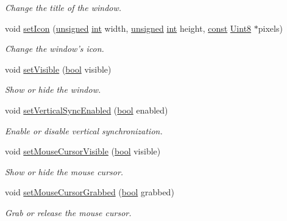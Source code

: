 \begin{DoxyCompactItemize}
\begin{DoxyCompactList}\small\item\em Change the title of the window. \end{DoxyCompactList}\item 
void \hyperlink{classsf_1_1_window_a63af61e026fba08e3153fd013620bcc0}{set\-Icon} (\hyperlink{curses_8priv_8h_aca40206900cfc164654362fa8d4ad1e6}{unsigned} \hyperlink{term__entry_8h_ad65b480f8c8270356b45a9890f6499ae}{int} width, \hyperlink{curses_8priv_8h_aca40206900cfc164654362fa8d4ad1e6}{unsigned} \hyperlink{term__entry_8h_ad65b480f8c8270356b45a9890f6499ae}{int} height, \hyperlink{term__entry_8h_a57bd63ce7f9a353488880e3de6692d5a}{const} \hyperlink{namespacesf_a4ef3d630785c4f296f9b4f274c33d78e}{Uint8} $\ast$pixels)
\begin{DoxyCompactList}\small\item\em Change the window's icon. \end{DoxyCompactList}\item 
void \hyperlink{classsf_1_1_window_a160f7f11a207603d7e99ce606e749703}{set\-Visible} (\hyperlink{term__entry_8h_a002004ba5d663f149f6c38064926abac}{bool} visible)
\begin{DoxyCompactList}\small\item\em Show or hide the window. \end{DoxyCompactList}\item 
void \hyperlink{classsf_1_1_window_a59041c4556e0351048f8aff366034f61}{set\-Vertical\-Sync\-Enabled} (\hyperlink{term__entry_8h_a002004ba5d663f149f6c38064926abac}{bool} enabled)
\begin{DoxyCompactList}\small\item\em Enable or disable vertical synchronization. \end{DoxyCompactList}\item 
void \hyperlink{classsf_1_1_window_aad3991c25e0a83afbb4d62febf9b7b14}{set\-Mouse\-Cursor\-Visible} (\hyperlink{term__entry_8h_a002004ba5d663f149f6c38064926abac}{bool} visible)
\begin{DoxyCompactList}\small\item\em Show or hide the mouse cursor. \end{DoxyCompactList}\item 
void \hyperlink{classsf_1_1_window_a5b4ef8ede77531e17b7a0287fa6ff9ce}{set\-Mouse\-Cursor\-Grabbed} (\hyperlink{term__entry_8h_a002004ba5d663f149f6c38064926abac}{bool} grabbed)
\begin{DoxyCompactList}\small\item\em Grab or release the mouse cursor. \end{DoxyCompactList}\item 

\end{DoxyCompactItemize}
